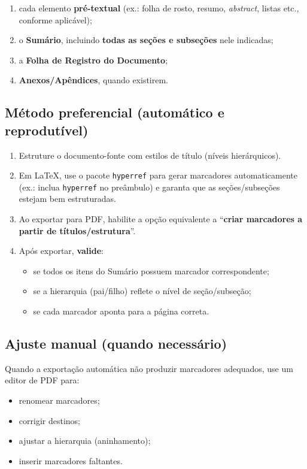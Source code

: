 \begin{enumerate}
    \item cada elemento \textbf{pré-textual} (ex.: folha de rosto, resumo, \textit{abstract}, listas etc., conforme aplicável);
    \item o \textbf{Sumário}, incluindo \textbf{todas as seções e subseções} nele indicadas;
    \item a \textbf{Folha de Registro do Documento};
    \item \textbf{Anexos/Apêndices}, quando existirem.
\end{enumerate}

\subsection{Método preferencial (automático e reprodutível)}

\begin{enumerate}
    \item Estruture o documento-fonte com estilos de título (níveis hierárquicos).
    \item Em \LaTeX{}, use o pacote \texttt{hyperref} para gerar marcadores automaticamente (ex.: inclua \texttt{hyperref} no preâmbulo) e garanta que as seções/subseções estejam bem estruturadas.
    \item Ao exportar para PDF, habilite a opção equivalente a ``\textbf{criar marcadores a partir de títulos/estrutura}''.
    \item Após exportar, \textbf{valide}:
    \begin{itemize}
        \item se todos os itens do Sumário possuem marcador correspondente;
        \item se a hierarquia (pai/filho) reflete o nível de seção/subseção;
        \item se cada marcador aponta para a página correta.
    \end{itemize}
\end{enumerate}

\subsection{Ajuste manual (quando necessário)}

Quando a exportação automática não produzir marcadores adequados, use um editor de PDF para:

\begin{itemize}
    \item renomear marcadores;
    \item corrigir destinos;
    \item ajustar a hierarquia (aninhamento);
    \item inserir marcadores faltantes.
\end{itemize}

